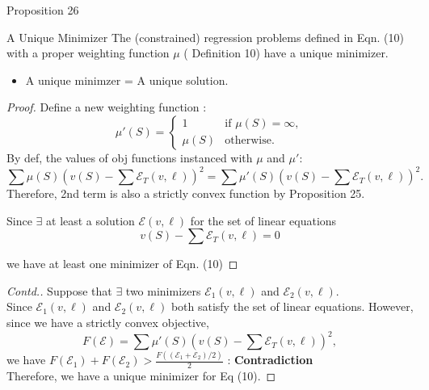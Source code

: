 \documentclass[10pt]{beamer}
\newcommand{\f}{v}
\newcommand{\ex}{\Expl}
\def\Expl{\mathcal{E}}
\begin{document}
\begin{frame}{Proposition 26}
    \begin{myaxiombox}{A Unique Minimizer}
        The (constrained) regression problems defined in  Eqn. (10) with a proper weighting function $\mu$ ( Definition 10)
        have a unique minimizer.
    \end{myaxiombox}
    \vspace{1.5em}
    \begin{itemize}[label=\scalebox{0.5}{$\blacksquare$}]
        \item A unique minimzer = A unique solution.
    \end{itemize}
\end{frame}
\begin{frame}
    \begin{proof}
    
    Define a new weighting function :
    \[
    \mu'(S) = 
    \begin{cases} 
    1 & \text{if } \mu(S) = \infty, \\
    \mu(S) & \text{otherwise.}
    \end{cases}
    \]
    By def, the values of obj functions instanced with $\mu$ and $\mu'$:
    $$
    \sum  \mu(S) \left( \f(S) - \sum \Expl_T(\f,\ell) \right)^2
    = \sum  \mu'(S) \left( \f(S) - \sum\Expl_T(\f,\ell) \right)^2.
    $$
    Therefore, 2nd term is also a strictly convex function by Proposition 25.
    
    Since $\exists$ at least a solution $\ex(\f,\ell)$ for the set of linear equations \\
    $$\f(S) - \sum\Expl_T(\f,\ell) =0$$
    
    we have at least one minimizer of Eqn. (10)
    \renewcommand{\qedsymbol}{} %
    \end{proof}

    
\end{frame}
\begin{frame}
    \begin{proof}[Contd.]
        \vspace{0.3cm}
        Suppose that $\exists$ two minimizers $\ex_1(\f,\ell)$ and $\ex_2(\f,\ell)$. \\
        Since $\ex_1(\f,\ell)$ and $\ex_2(\f,\ell)$ both satisfy the set of linear equations. However, since we have a strictly convex objective,
        $$
        F(\ex) = \sum  \mu'(S) \left( \f(S) - \sum\Expl_T(\f,\ell) \right)^2,
        $$
        we have $F(\ex_1) + F(\ex_2) > \frac{F((\ex_1+\ex_2)/2)}{2}$ : \textbf{Contradiction} \\
        Therefore, we have a unique minimizer for Eq (10).
    \end{proof}
\end{frame}
\end{document}
